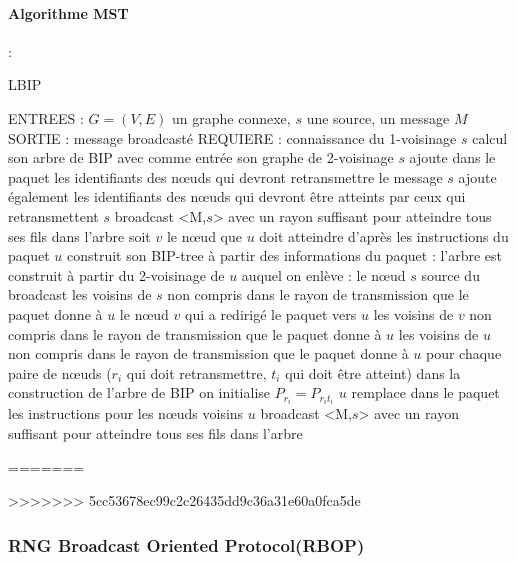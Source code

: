 \paragraph{Algorithme MST}:

\begin{algorithm}[H]
\caption{LBIP}
\label{algo_LBIP}
\begin{algorithmic}
\STATE ENTREES : $G=(V,E)$ un graphe connexe, $s$ une source, un message $M$
\STATE SORTIE : message broadcasté
\STATE REQUIERE : connaissance du 1-voisinage
\STATE $s$ calcul son arbre de BIP avec comme entrée son graphe de 2-voisinage
\STATE $s$ ajoute dans le paquet les identifiants des nœuds qui devront retransmettre le message
\STATE $s$ ajoute également les identifiants des nœuds qui devront être atteints par ceux qui retransmettent
\STATE $s$ broadcast <M,$s$> avec un rayon suffisant pour atteindre tous ses fils dans l'arbre
		\STATE soit $v$ le nœud que $u$ doit atteindre d'après les instructions du paquet
		\STATE $u$ construit son BIP-tree à partir des informations du paquet :
			 \INDSTATE l'arbre est construit à partir du 2-voisinage de $u$ auquel on enlève :
			 	 \INDSTATE[2]le nœud $s$ source du broadcast
				 \INDSTATE[2]les voisins de $s$ non compris dans le rayon de transmission que le paquet donne à $u$
				 \INDSTATE[2]le nœud $v$ qui a redirigé le paquet vers $u$
				 \INDSTATE[2]les voisins de $v$ non compris dans le rayon de transmission que le paquet donne à $u$
				\INDSTATE[2]les voisins de $u$ non compris dans le rayon de transmission que le paquet donne à $u$
			\INDSTATE[1] pour chaque paire de nœuds ($r_i$ qui doit retransmettre, $t_i$ qui doit être atteint)
				\INDSTATE[2] dans la construction de l'arbre de BIP on initialise $P_{r_i} = P_{r_i t_i}$
			\INDSTATE[1] $u$ remplace dans le paquet les instructions pour les nœuds voisins
			\INDSTATE[1] $u$ broadcast <M,$s$> avec un rayon suffisant pour atteindre tous ses fils dans l'arbre
	\ENDIF
\ENDIF
\end{algorithmic}
\end{algorithm}
=======

>>>>>>> 5cc53678ec99c2c26435dd9c36a31e60a0fca5de

\subsubsection{ RNG Broadcast Oriented Protocol(RBOP) }





